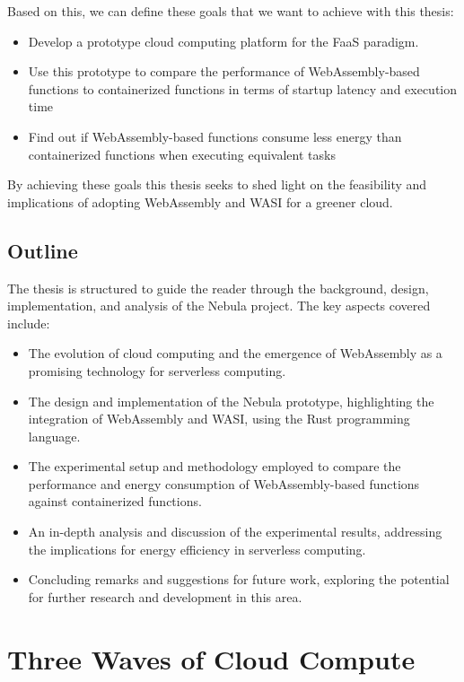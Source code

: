 \documentclass[
  table]{report}
\providecommand{\tightlist}{%
  \setlength{\itemsep}{0pt}\setlength{\parskip}{0pt}}
\begin{document}
Based on this, we can define these goals that we want to achieve with
this thesis:

\begin{itemize}
\tightlist
\item
  Develop a prototype cloud computing platform for the \ac{FaaS}
  paradigm.
\item
  Use this prototype to compare the performance of WebAssembly-based
  functions to containerized functions in terms of startup latency and
  execution time
\item
  Find out if WebAssembly-based functions consume less energy than
  containerized functions when executing equivalent tasks
\end{itemize}

By achieving these goals this thesis seeks to shed light on the
feasibility and implications of adopting WebAssembly and \ac{WASI} for a
greener cloud.

\section{Outline}

The thesis is structured to guide the reader through the background,
design, implementation, and analysis of the Nebula project. The key
aspects covered include:

\begin{itemize}
\item
  The evolution of cloud computing and the emergence of WebAssembly as a
  promising technology for serverless computing.
\item
  The design and implementation of the Nebula prototype, highlighting
  the integration of WebAssembly and WASI, using the Rust programming
  language.
\item
  The experimental setup and methodology employed to compare the
  performance and energy consumption of WebAssembly-based functions
  against containerized functions.
\item
  An in-depth analysis and discussion of the experimental results,
  addressing the implications for energy efficiency in serverless
  computing.
\item
  Concluding remarks and suggestions for future work, exploring the
  potential for further research and development in this area.
\end{itemize}

\newpage

\chapter{Three Waves of Cloud Compute}
\label{chap:three-waves}
\end{document}
